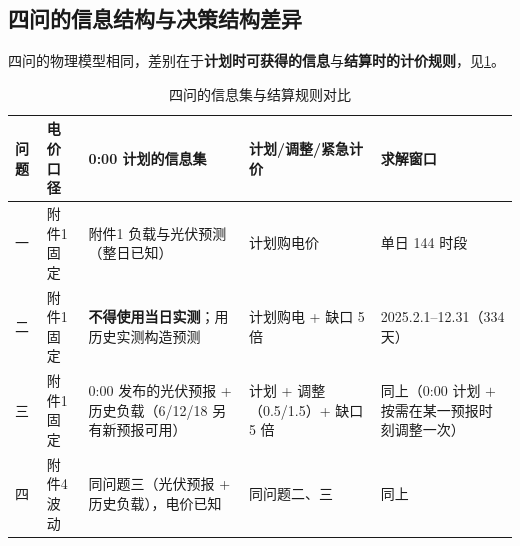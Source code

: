 \subsection{四问的信息结构与决策结构差异}

四问的物理模型相同\nobreak，差别在于\textbf{计划时可获得的信息}与\textbf{结算时的计价规则}\nobreak，见\cref{tab:info}\nobreak。

\begin{table}[htbp]
\centering
\caption{四问的信息集与结算规则对比}
\label{tab:info}
\begin{tabularx}{\textwidth}{@{}p{1.2cm}p{2.5cm}p{3.3cm}p{3.6cm}X@{}}
\toprule
问题 & 电价口径 & 0:00 计划的信息集 & 计划/调整/紧急计价 & 求解窗口 \\
\midrule
一 & 附件1 固定 & 附件1 负载与光伏预测（整日已知\nobreak） & 计划购电价 & 单日 144 时段 \\
二 & 附件1 固定 & \textbf{不得使用当日实测}\nobreak；用历史实测构造预测 & 计划购电 + 缺口 5 倍 & 2025.2.1--12.31（334 天\nobreak） \\
三 & 附件1 固定 & 0:00 发布的光伏预报 + 历史负载（6/12/18 另有新预报可用\nobreak） & 计划 + 调整（0.5/1.5\nobreak）+ 缺口 5 倍 & 同上（0:00 计划 $+$ 按需在某一预报时刻调整一次\nobreak） \\
四 & 附件4 波动 & 同问题三（光伏预报 + 历史负载\nobreak）\nobreak，电价已知 & 同问题二\nobreak、三 & 同上 \\
\bottomrule
\end{tabularx}
\end{table}

